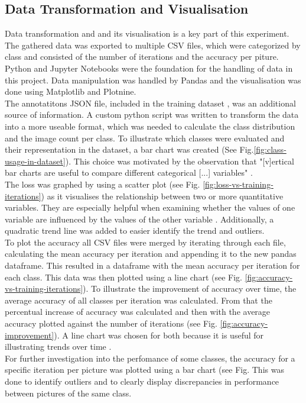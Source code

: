 \subsection{Data Transformation and Visualisation}
Data transformation and and its visualisation is a key part of this experiment. The gathered data was exported to multiple CSV files, 
which were categorized by class and consisted of the number of iterations and the accuracy per piture. Python and Jupyter Notebooks were the
foundation for the handling of data in this project. Data manipulation was handled by Pandas and the visualisation was done using Matplotlib
and Plotnine.\\
The annotatitons JSON file, included in the training dataset \parencite{pascal2023}, was an additional source of information. 
A custom python script was written to transform the data into a more useable format, which was needed to calculate the class distribution 
and the image count per class. To illustrate which classes were evaluated and their representation in the dataset, a bar chart was created 
(See Fig.\ref{fig:class-usage-in-dataset}). This choice was motivated by the observation that "[v]ertical bar charts are useful to compare 
different categorical [...] variables" \parencite{Statistics-Canada2021}.\\
The loss was graphed by using a scatter plot (see Fig. \ref{fig:loss-vs-training-iterations})
as it visualises the relationship between two or more quantitative variables. They are especially helpful when examining whether
the values of one variable are influenced by the values of the other variable \parencite{Statistics-Canada2021b}. 
Additionally, a quadratic trend line was added to easier identify the trend and outliers.\\
To plot the accuracy all CSV files were merged by iterating through each file, calculating the mean accuracy per iteration and appending it
to the new pandas dataframe. This resulted in a dataframe with the mean accuracy per iteration for each class. This data was then plotted using
a line chart (see Fig. \ref{fig:accuracy-vs-training-iterations}).
To illustrate the improvement of accuracy over time, the average accuracy of all classes per iteration was calculated.
From that the percentual increase of accuracy was calculated and then with the average accuracy plotted against the number of iterations
(see Fig. \ref{fig:accuracy-improvement}).
A line chart was chosen for both because it is useful for illustrating trends over time \parencite{Statistics-Canada2021a}.\\
For further investigation into the perfomance of some classes, the accuracy for a specific iteration per picture was plotted 
using a bar chart (see Fig. %
This was done to identify outliers and to clearly display discrepancies in performance between pictures of the same class.\\

